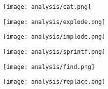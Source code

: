 \begin{multicols}{2}
\begin{center}
\texttt{[image: analysis/cat.png]} 
\end{center}
\columnbreak
\begin{center}
\texttt{[image: analysis/explode.png]} 
\end{center}
\end{multicols}

\begin{multicols}{2}
\begin{center}
\texttt{[image: analysis/implode.png]} 
\end{center}
\columnbreak
\begin{center}
\texttt{[image: analysis/sprintf.png]} 
\end{center}
\end{multicols}

\begin{multicols}{2}
\begin{center}
\texttt{[image: analysis/find.png]} 
\end{center}
\columnbreak
\begin{center}
\texttt{[image: analysis/replace.png]} 
\end{center}
\end{multicols}

